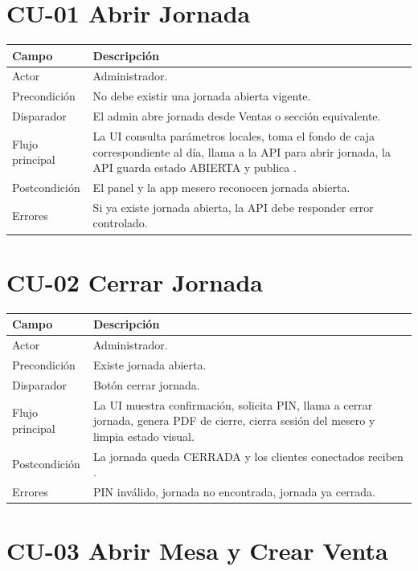 \documentclass[11pt,letterpaper,openany]{report}
\newcommand{\code}[1]{\texttt{\detokenize{#1}}}
\begin{document}
\section{CU-01 Abrir Jornada}

\begin{longtable}{p{}p{}}
\toprule
\textbf{Campo} & \textbf{Descripción}\\
\midrule
Actor & Administrador.\\
Precondición & No debe existir una jornada abierta vigente.\\
Disparador & El admin abre jornada desde Ventas o sección equivalente.\\
Flujo principal & La UI consulta parámetros locales, toma el fondo de caja correspondiente al día, llama a la API para abrir jornada, la API guarda estado ABIERTA y publica \code{/topic/jornada}.\\
Postcondición & El panel y la app mesero reconocen jornada abierta.\\
Errores & Si ya existe jornada abierta, la API debe responder error controlado.\\
\bottomrule
\end{longtable}

\section{CU-02 Cerrar Jornada}

\begin{longtable}{p{}p{}}
\toprule
\textbf{Campo} & \textbf{Descripción}\\
\midrule
Actor & Administrador.\\
Precondición & Existe jornada abierta.\\
Disparador & Botón cerrar jornada.\\
Flujo principal & La UI muestra confirmación, solicita PIN, llama a cerrar jornada, genera PDF de cierre, cierra sesión del mesero y limpia estado visual.\\
Postcondición & La jornada queda CERRADA y los clientes conectados reciben \code{/topic/jornada}.\\
Errores & PIN inválido, jornada no encontrada, jornada ya cerrada.\\
\bottomrule
\end{longtable}

\section{CU-03 Abrir Mesa y Crear Venta}
\end{document}
